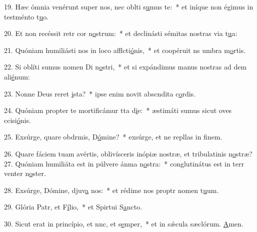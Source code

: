 19. Hæc ómnia venérunt super nos, nec oblti s\uline{u}mus te:~* et iníque non égimus in testménto t\uline{u}o.\par 
20. Et non recéssit retr cor n\uline{o}strum:~* et declinásti sémitas nostras  via t\uline{u}a:\par 
21. Quóniam humiliásti nos in loco afflcti\uline{ó}nis,~* et coopéruit ns umbra m\uline{o}rtis.\par 
22. Si oblíti sumus nomen Di n\uline{o}stri,~* et si expándimus manus nostras ad dem ali\uline{é}num:\par 
23. Nonne Deus reret \uline{i}sta?~* ipse enim novit abscndita c\uline{o}rdis.\par 
24. Quóniam propter te mortificámur tta d\uline{i}e:~* æstimáti sumus sicut oves ccisi\uline{ó}nis.\par 
25. Exsúrge, quare obdrmis, D\uline{ó}mine?~* exsúrge, et ne repllas in f\uline{i}nem.\par 
26. Quare fáciem tuam avértis, oblivísceris inópiæ nostræ, et tribulatinis n\uline{o}stræ?
27. Quóniam humiliáta est in púlvere ánma n\uline{o}stra:~* conglutinátus est in terr venter n\uline{o}ster.\par 
28. Exsúrge, Dómine, djuv\uline{a} nos:~* et rédime nos proptr nomen t\uline{u}um.\par 
29. Glória Patr, et F\uline{í}lio,~* et Spirtui S\uline{a}ncto.\par 
30. Sicut erat in princípio, et nnc, et s\uline{e}mper,~* et in sǽcula sæclórum. \uline{A}men.\par 
